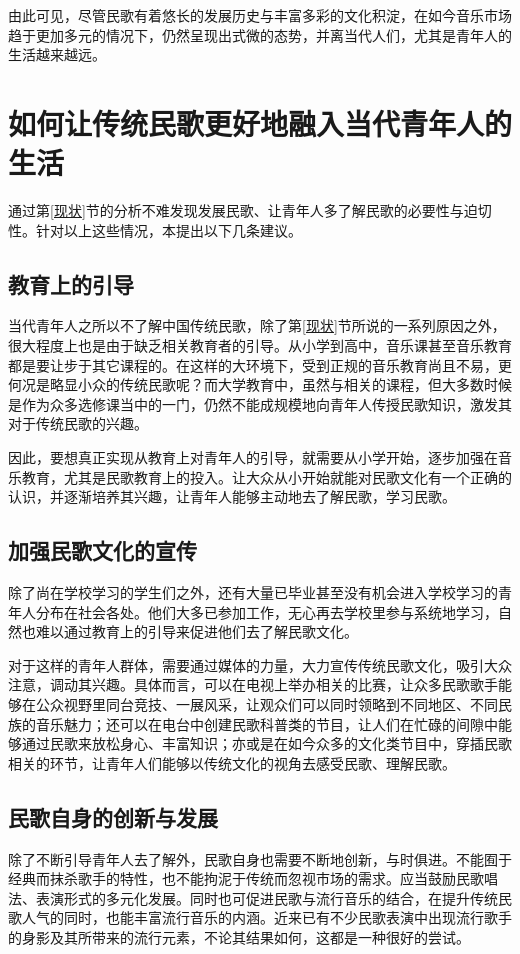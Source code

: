 \documentclass[UTF8,a4paper]{ctexart}
\begin{document}
\begin{multicols}{2}
		\indent 由此可见，尽管民歌有着悠长的发展历史与丰富多彩的文化积淀，在如今音乐市场趋于更加多元的情况下，仍然呈现出式微的态势，并离当代人们，尤其是青年人的生活越来越远。
	
		
		\section{如何让传统民歌更好地融入当代青年人的生活}
		\indent 通过第\ref{现状}节的分析不难发现发展民歌、让青年人多了解民歌的必要性与迫切性。针对以上这些情况，本提出以下几条建议。
		
			\subsection{教育上的引导}
			\indent 当代青年人之所以不了解中国传统民歌，除了第\ref{现状}节所说的一系列原因之外，很大程度上也是由于缺乏相关教育者的引导。从小学到高中，音乐课甚至音乐教育都是要让步于其它课程的。在这样的大环境下，受到正规的音乐教育尚且不易，更何况是略显小众的传统民歌呢？而大学教育中，虽然与相关的课程，但大多数时候是作为众多选修课当中的一门，仍然不能成规模地向青年人传授民歌知识，激发其对于传统民歌的兴趣。
			
			\indent 因此，要想真正实现从教育上对青年人的引导，就需要从小学开始，逐步加强在音乐教育，尤其是民歌教育上的投入。让大众从小开始就能对民歌文化有一个正确的认识，并逐渐培养其兴趣，让青年人能够主动地去了解民歌，学习民歌。
				
			\subsection{加强民歌文化的宣传}
			\indent 除了尚在学校学习的学生们之外，还有大量已毕业甚至没有机会进入学校学习的青年人分布在社会各处。他们大多已参加工作，无心再去学校里参与系统地学习，自然也难以通过教育上的引导来促进他们去了解民歌文化。
				
			\indent 对于这样的青年人群体，需要通过媒体的力量，大力宣传传统民歌文化，吸引大众注意，调动其兴趣。具体而言，可以在电视上举办相关的比赛，让众多民歌歌手能够在公众视野里同台竞技、一展风采，让观众们可以同时领略到不同地区、不同民族的音乐魅力；还可以在电台中创建民歌科普类的节目，让人们在忙碌的间隙中能够通过民歌来放松身心、丰富知识；亦或是在如今众多的文化类节目中，穿插民歌相关的环节，让青年人们能够以传统文化的视角去感受民歌、理解民歌。
			
			
			\subsection{民歌自身的创新与发展}
		    \indent 除了不断引导青年人去了解外，民歌自身也需要不断地创新，与时俱进。不能囿于经典而抹杀歌手的特性，也不能拘泥于传统而忽视市场的需求。应当鼓励民歌唱法、表演形式的多元化发展。同时也可促进民歌与流行音乐的结合，在提升传统民歌人气的同时，也能丰富流行音乐的内涵。近来已有不少民歌表演中出现流行歌手的身影及其所带来的流行元素，不论其结果如何，这都是一种很好的尝试。
		    

\end{multicols}
\end{document}

